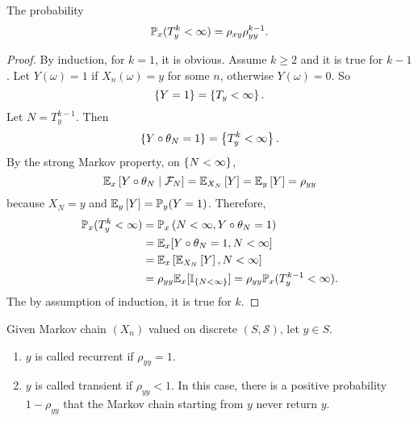 \begin{thm}
    The probability
    \begin{equation*}
        \mathbb{P}_x(T^k_y < \infty) = \rho_{xy}\rho_{yy}^{k-1}.
    \end{equation*}
\end{thm}
\begin{proof}
    By induction, for $k = 1$, it is obvious. Assume $k \geq 2$ and it is true for $k-1$. Let $Y(\omega) = 1$ if $X_n(\omega) = y$ for some $n$, otherwise $Y(\omega) = 0$. So
    \begin{equation*}
        \left\{Y = 1\right\} = \left\{T_y < \infty\right\}.
    \end{equation*}
    Let $N = T^{k-1}_y$. Then
    \begin{equation*}
        \left\{Y \circ \theta_N = 1\right\} = \left\{T^k_y < \infty\right\}.
    \end{equation*}
    By the strong Markov property, on $\left\{N < \infty\right\}$,
    \begin{equation*}
        \mathbb{E}_x\left[Y \circ \theta_N \mid \mathcal{F}_N\right] = \mathbb{E}_{X_N}\left[Y\right] = \mathbb{E}_y\left[Y\right] =\rho_{yy}
    \end{equation*}
    because $X_N = y$ and $\mathbb{E}_y\left[Y\right] = \mathbb{P}_y(Y = 1)$. Therefore,
    \begin{equation*}
        \begin{aligned}
            \mathbb{P}_x(T^k_y < \infty) &= \mathbb{P}_x\left(N < \infty, Y \circ \theta_N = 1\right) \\
            &= \mathbb{E}_x[Y\circ \theta_N = 1, N < \infty] \\
            &= \mathbb{E}_x\left[\mathbb{E}_{X_N}\left[Y\right], N < \infty\right] \\
            &= \rho_{yy}\mathbb{E}_x[\mathbb{I}_{\left\{N < \infty\right\}}] = \rho_{yy}\mathbb{P}_x(T^{k-1}_y < \infty).
        \end{aligned}
    \end{equation*}
    The by assumption of induction, it is true for $k$. \qedhere
\end{proof}

\begin{defn}
    Given Markov chain $(X_n)$ valued on discrete $(S,\mathcal{S})$, let $y \in S$.
    \begin{enumerate}[label=(\arabic{*})]
        \item $y$ is called recurrent if $\rho_{yy} = 1$.
        \item $y$ is called transient if $\rho_{yy} < 1$. In this case, there is a positive probability $1 - \rho_{yy}$ that the Markov chain starting from $y$ never return $y$.
    \end{enumerate}
\end{defn}

